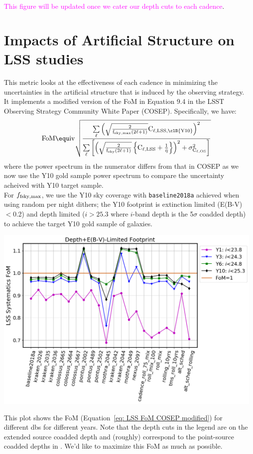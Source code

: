 \documentclass[a4paper,10pt]{article}
\newcommand{\ttt}[1]{\texttt{#1}}
\newcommand{\cl}[1]{\textcolor{magenta}{#1}}
\begin{document}
\cl{This figure will be updated once we cater our depth cuts to each cadence}.

\newpage 
\section*{Impacts of Artificial Structure on LSS studies\label{OS systematics}}
This metric looks at the effectiveness of each cadence in minimizing the uncertainties in the artificial structure that is induced by the observing strategy. It implements a modified version of the FoM in Equation 9.4 in the LSST Observing Strategy Community White Paper (COSEP). Specifically, we have:
\begin{equation}
	\rm{FoM} \equ iv \sqrt{
			\frac{
				\sum\limits_\ell{ \left({\sqrt{ \frac{2}{f_{\rm{sky, max}} (2\ell + 1)} }
									C_{\ell, \rm{LSS, \clB{Y10}}}} \right)
				}^2
				}{
				\sum\limits_\ell \left[{\left( { \sqrt{\frac{2}{f_{\rm{sky}} (2\ell + 1)}}
									\left\{{C_{\ell, \rm{LSS}} + \frac{1}{\bar{\eta}}} \right\}  } \right ) ^2
									+ \sigma_{C_{\ell,\rm{OS}}}^2  }\right]
				}
			}
\label{eq: LSS FoM COSEP modified}
\end{equation}
where the power spectrum in the numerator differs from that in COSEP as we now use the Y10 gold sample power spectrum to compare the uncertainty acheived with Y10 target sample.\\

For $f_{\rm{fsky, max}}$, we use the Y10 sky coverage with \ttt{baseline2018a} achieved when using random per night dithers; the Y10 footprint is extinction limited (E(B-V)$<$0.2) and depth limited ($i>25.3$ where $i$-band depth is the 5$\sigma$ coadded depth) to achieve the target Y10 gold sample of galaxies.

\begin{minipage}{\columnwidth}
\vspace*{2em}
\centering
 \includegraphics[width=.75\columnwidth]{lss_compare_foms_egfootprint_22dbs_2018-11-24data_srdcuts_noisefom.png}
\vspace*{2em}
\end{minipage}
This plot shows the FoM (Equation~\ref{eq:  LSS FoM COSEP modified}) for different dbs for different years. Note that the depth cuts in the legend are on the extended source coadded depth and (roughly) correspond to the point-source coadded depths in . We'd like to maximize this FoM as much as possible.
\end{document}
